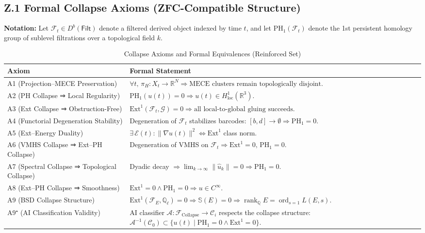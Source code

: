 \documentclass[11pt]{article}
\newcommand{\Sha}{\mathbb{S}}
\begin{document}
\begin{axiom}
\begin{axiom}
{{\subsection*{Z.1 Formal Collapse Axioms (ZFC-Compatible Structure)}

\textbf{Notation:} Let \( \mathcal{F}_t \in D^b(\mathsf{Filt}) \) denote a filtered derived object indexed by time \( t \),  
and let \( \mathrm{PH}_1(\mathcal{F}_t) \) denote the 1st persistent homology group of sublevel filtrations over a topological field \( k \).  

\begin{table}[H]
\centering
\renewcommand{\arraystretch}{1.4}
\begin{tabularx}{\textwidth}{lX}
\toprule
\textbf{Axiom} & \textbf{Formal Statement} \\
\midrule
A1 (Projection–MECE Preservation) & 
\( \forall t,\, \pi_H: X_t \to \mathbb{R}^N \Rightarrow \text{MECE clusters remain topologically disjoint}. \) \\
A2 (PH Collapse ⇒ Local Regularity) & 
\( \mathrm{PH}_1(u(t)) = 0 \Rightarrow u(t) \in H^1_{\text{loc}}(\mathbb{R}^3). \) \\
A3 (Ext Collapse ⇒ Obstruction-Free) & 
\( \mathrm{Ext}^1(\mathcal{F}_t, \mathcal{G}) = 0 \Rightarrow \text{all local-to-global gluing succeeds}. \) \\
A4 (Functorial Degeneration Stability) & 
Degeneration of \( \mathcal{F}_t \) stabilizes barcodes: \( [b,d] \to \emptyset \Rightarrow \mathrm{PH}_1 = 0. \) \\
A5 (Ext–Energy Duality) & 
\( \exists\, \mathcal{E}(t): \|\nabla u(t)\|^2 \Leftrightarrow \mathrm{Ext}^1 \) class norm. \\
A6 (VMHS Collapse ⇒ Ext–PH Collapse) & 
Degeneration of VMHS on \( \mathcal{F}_t \Rightarrow \mathrm{Ext}^1 = 0,\, \mathrm{PH}_1 = 0. \) \\
A7 (Spectral Collapse ⇒ Topological Collapse) & 
Dyadic decay \( \Rightarrow \lim_{k \to \infty} \|\hat{u}_k\| = 0 \Rightarrow \mathrm{PH}_1 = 0. \) \\
A8 (Ext–PH Collapse ⇒ Smoothness) & 
\( \mathrm{Ext}^1 = 0 \land \mathrm{PH}_1 = 0 \Rightarrow u \in C^\infty. \) \\
A9 (BSD Collapse Structure) & 
\( \mathrm{Ext}^1(\mathcal{F}_E, \mathbb{Q}_\ell) = 0 \Rightarrow \Sha(E) = 0 \Rightarrow 
\operatorname{rank}_{\mathbb{Q}} E = \operatorname{ord}_{s=1} L(E, s). \) \\
A9⁺ (AI Classification Validity) & 
AI classifier \( \mathcal{A}: \mathcal{F}_{\text{Collapse}} \to \mathcal{C}_i \) respects the collapse structure:  
\( \mathcal{A}^{-1}(\mathcal{C}_0) \subset \{ u(t) \mid \mathrm{PH}_1 = 0 \land \mathrm{Ext}^1 = 0 \} \). \\
\bottomrule
\end{tabularx}
\caption{Collapse Axioms and Formal Equivalences (Reinforced Set)}
\end{table}

}}
\end{axiom}
\end{axiom}
\end{document}
